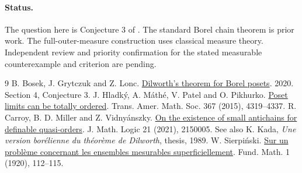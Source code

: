 \documentclass[11pt]{article}
\begin{document}
\paragraph{Status.} The question here is Conjecture 3 of \cite{bgl}. The standard Borel chain theorem is prior work. The full-outer-measure construction uses classical measure theory. Independent review and priority confirmation for the stated measurable counterexample and criterion are pending.
\begin{thebibliography}{9}
 B. Bosek, J. Grytczuk and Z. Lonc. \href{https://arxiv.org/abs/2004.02162}{Dilworth's theorem for Borel posets}. 2020. Section 4, Conjecture 3.
 J. Hladký, A. Máthé, V. Patel and O. Pikhurko. \href{https://doi.org/10.1090/S0002-9947-2015-06299-0}{Poset limits can be totally ordered}. Trans. Amer. Math. Soc. 367 (2015), 4319--4337.
 R. Carroy, B. D. Miller and Z. Vidnyánszky. \href{https://doi.org/10.1142/S0219061321500057}{On the existence of small antichains for definable quasi-orders}. J. Math. Logic 21 (2021), 2150005. See also K. Kada, \emph{Une version borélienne du théorème de Dilworth}, thesis, 1989.
 W. Sierpiński. \href{https://doi.org/10.4064/fm-1-1-112-115}{Sur un problème concernant les ensembles mesurables superficiellement}. Fund. Math. 1 (1920), 112--115.
\end{thebibliography}
\end{document}
